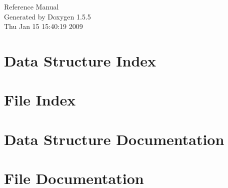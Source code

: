\documentclass[a4paper]{book}
\begin{document}
\begin{titlepage}
\vspace*{7cm}
\begin{center}
{\Large Reference Manual}\\
\vspace*{1cm}
{\large Generated by Doxygen 1.5.5}\\
\vspace*{0.5cm}
{\small Thu Jan 15 15:40:19 2009}\\
\end{center}
\end{titlepage}
\clearemptydoublepage
{}
\tableofcontents
\clearemptydoublepage
{}
\chapter{Data Structure Index}

\chapter{File Index}

\chapter{Data Structure Documentation}


\chapter{File Documentation}














\printindex
\end{document}
